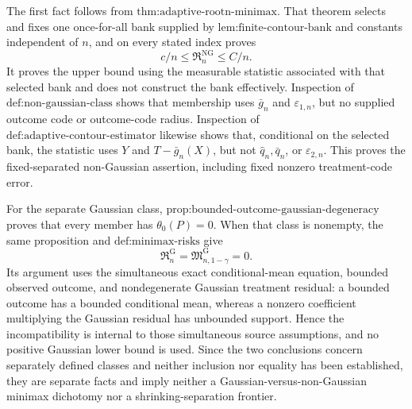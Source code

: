 The first fact follows from \(\text{thm:adaptive-rootn-minimax}\).  That theorem selects and fixes one once-for-all bank supplied by \(\text{lem:finite-contour-bank}\) and constants independent of \(n\), and on every stated index proves
\[
 c/n\le\mathfrak R_n^{\mathrm{NG}}\le C/n.
\]
It proves the upper bound using the measurable statistic associated with that selected bank and does not construct the bank effectively.  Inspection of \(\text{def:non-gaussian-class}\) shows that membership uses \(\bar g_n\) and \(\varepsilon_{1,n}\), but no supplied outcome code or outcome-code radius.  Inspection of \(\text{def:adaptive-contour-estimator}\) likewise shows that, conditional on the selected bank, the statistic uses \(Y\) and \(T-\bar g_n(X)\), but not \(\widehat q_n,\bar q_n\), or \(\varepsilon_{2,n}\).  This proves the fixed-separated non-Gaussian assertion, including fixed nonzero treatment-code error.

For the separate Gaussian class, \(\text{prop:bounded-outcome-gaussian-degeneracy}\) proves that every member has \(\theta_0(P)=0\).  When that class is nonempty, the same proposition and \(\text{def:minimax-risks}\) give
\[
 \mathfrak R_n^{\mathrm G}=\mathfrak M_{n,1-\gamma}^{\mathrm G}=0.
\]
Its argument uses the simultaneous exact conditional-mean equation, bounded observed outcome, and nondegenerate Gaussian treatment residual: a bounded outcome has a bounded conditional mean, whereas a nonzero coefficient multiplying the Gaussian residual has unbounded support.  Hence the incompatibility is internal to those simultaneous source assumptions, and no positive Gaussian lower bound is used.  Since the two conclusions concern separately defined classes and neither inclusion nor equality has been established, they are separate facts and imply neither a Gaussian-versus-non-Gaussian minimax dichotomy nor a shrinking-separation frontier.